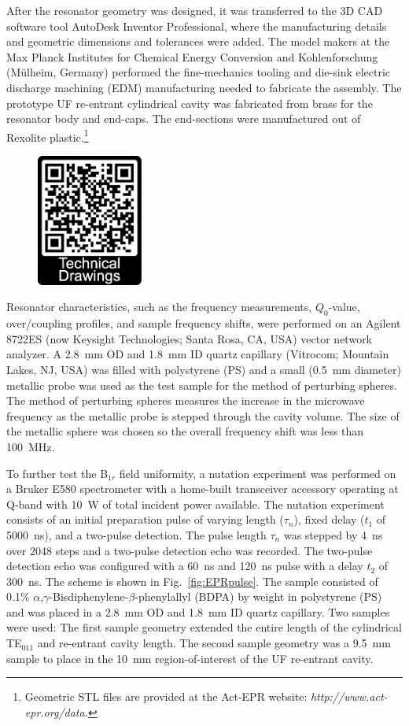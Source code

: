 After the resonator geometry was designed, it was transferred to the 3D CAD software tool AutoDesk Inventor Professional, where the manufacturing details and geometric dimensions and tolerances were added. The model makers at the Max Planck Institutes for Chemical Energy Conversion and Kohlenforschung (M\"ulheim, Germany) performed the fine-mechanics tooling and die-sink electric discharge machining (EDM) manufacturing needed to fabricate the assembly. The prototype UF re-entrant cylindrical \cylTE{} cavity was fabricated from brass for the resonator body and end-caps. The end-sections were manufactured out of Rexolite plastic.\footnote{Geometric STL files are provided at the Act-EPR website: \textit{http://www.act-epr.org/data.}}

\begin{figure}
\centering
\includegraphics[width=3.5cm]{Kapitel/Appendix/ActEPRdataQR.eps}
\end{figure}

Resonator characteristics, such as the frequency measurements, $Q_0$-value, over\-/coupling profiles, and sample frequency shifts, were performed on an Agilent 8722ES (now Keysight Technologies; Santa Rosa, CA, USA) vector network analyzer. A 2.8~mm OD and 1.8~mm ID quartz capillary (Vitrocom; Mountain Lakes, NJ, USA) was filled with polystyrene (PS) and a small (0.5~mm diameter) metallic probe was used as the test sample for the method of perturbing spheres. The method of perturbing spheres measures the increase in the microwave frequency as the metallic probe is stepped through the cavity volume. The size of the metallic sphere was chosen so the overall frequency shift was less than 100~MHz.

To further test the B$_{1r}$ field uniformity, a nutation experiment was performed on a Bruker E580 spectrometer with a home-built transceiver accessory operating at Q-band with 10~W of total incident power available. The nutation experiment consists of an initial preparation pulse of varying length ($\tau_n$), fixed delay ($t_1$ of 5000~ns), and a two-pulse detection. The pulse length $\tau_n$ was stepped by 4~ns over 2048 steps and a two-pulse detection echo was recorded. \cite{pulsejeschke} The two-pulse detection echo was configured with a 60~ns and 120~ns pulse with a delay $t_2$ of 300~ns. The scheme is shown in Fig.~\ref{fig:EPRpulse}. The sample consisted of 0.1\% $\alpha$,$\gamma$-Bisdiphenylene-$\beta$-phenylallyl (BDPA) by weight in polystyrene (PS) and was placed in a 2.8~mm OD and 1.8~mm ID  quartz capillary. Two samples were used: The first sample geometry extended the entire length of the cylindrical TE$_{011}$ and re-entrant \cylTE{} cavity length. The second sample geometry was a 9.5~mm sample to place in the 10~mm region-of-interest of the UF re-entrant \cylTE{} cavity.

